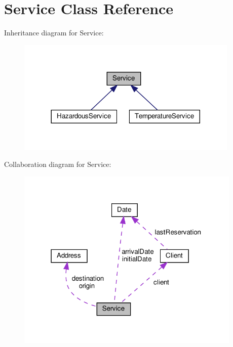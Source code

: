 \hypertarget{class_service}{}\section{Service Class Reference}
\label{class_service}


Inheritance diagram for Service\+:\nopagebreak
\begin{figure}[H]
\begin{center}
\leavevmode
\includegraphics[width=300pt]{class_service__inherit__graph}
\end{center}
\end{figure}


Collaboration diagram for Service\+:
\nopagebreak
\begin{figure}[H]
\begin{center}
\leavevmode
\includegraphics[width=303pt]{class_service__coll__graph}
\end{center}
\end{figure}
